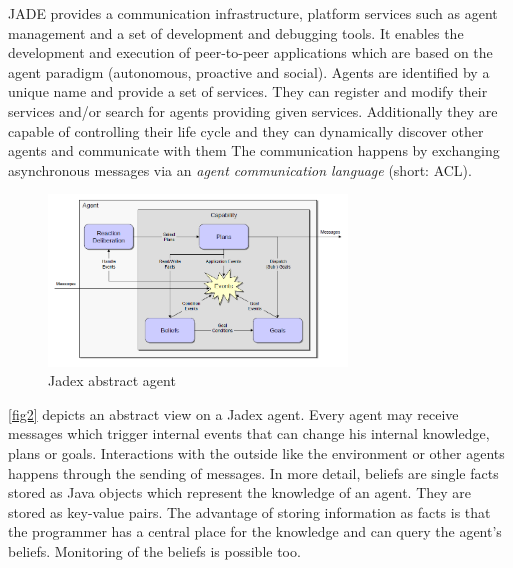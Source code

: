 JADE provides a communication infrastructure, platform services such as agent management and a set of development and debugging tools.
It enables the development and execution of peer-to-peer applications which are based on the agent paradigm (autonomous, proactive and social). %
Agents are identified by a unique name and provide a set of services.
They can register and modify their services and/or search for agents providing given services.
Additionally they are capable of controlling their life cycle and they can dynamically discover other agents and communicate with them
The communication happens by exchanging asynchronous messages via an \emph{agent communication language} (short: ACL). %

\begin{figure}
	\centering
	\includegraphics[width=300px]{images/Jadex_agent.png}
	\caption{Jadex abstract agent \cite{pokahr_jadex_2005}}
	\label{fig2}
\end{figure}
\autoref{fig2} depicts an abstract view on a Jadex agent. Every agent may receive messages which trigger internal events that can change his internal knowledge, plans or goals. Interactions with the outside like the environment or other agents happens through the sending of messages. %
In more detail, beliefs are single facts stored as Java objects which represent the knowledge of an agent. %
They are stored as key-value pairs.
The advantage of storing information as facts is that the programmer has a central place for the knowledge and can query the agent's beliefs. %
Monitoring of the beliefs is possible too.

